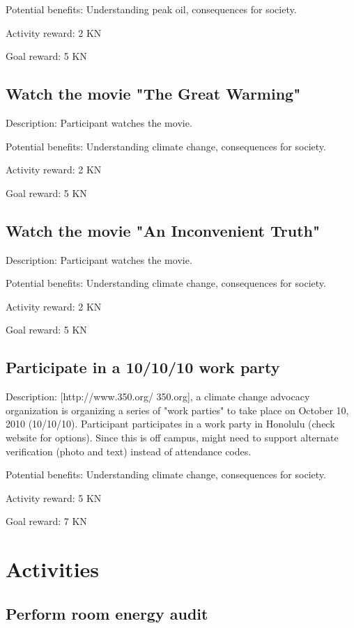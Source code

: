 Potential benefits: Understanding peak oil, consequences for society.

Activity reward: 2 KN

Goal reward: 5 KN

\subsection{Watch the movie "The Great Warming"}

Description: Participant watches the movie.

Potential benefits: Understanding climate change, consequences for society.

Activity reward: 2 KN

Goal reward: 5 KN

\subsection{Watch the movie "An Inconvenient Truth"}

Description: Participant watches the movie.

Potential benefits: Understanding climate change, consequences for society.

Activity reward: 2 KN

Goal reward: 5 KN

\subsection{Participate in a 10/10/10 work party}

Description: [http://www.350.org/ 350.org], a climate change advocacy organization is organizing a series of "work parties" to take place on October 10, 2010 (10/10/10). Participant participates in a work party in Honolulu (check website for options). Since this is off campus, might need to support alternate verification (photo and text) instead of attendance codes.

Potential benefits: Understanding climate change, consequences for society.

Activity reward: 5 KN

Goal reward: 7 KN


\section{Activities}

\subsection{Perform room energy audit}

